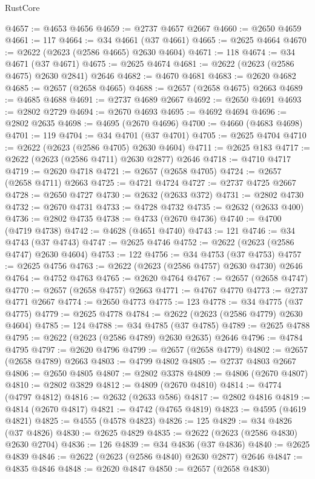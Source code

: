 \begin{lexlean}{RustCore}
\begin{coremodule}
@4657 := @4653 @4656
@4659 := @2737 @4657 @2667
@4660 := @2650 @4659
@4661 := 117
@4664 := @34 @4661 (@37 @4661)
@4665 := @2625 @4664
@4670 := @2622 (@2623 (@2586 @4665) @2630 @4604)
@4671 := 118
@4674 := @34 @4671 (@37 @4671)
@4675 := @2625 @4674
@4681 := @2622 (@2623 (@2586 @4675) @2630 @2841) @2646
@4682 := @4670 @4681
@4683 := @2620 @4682
@4685 := @2657 (@2658 @4665)
@4688 := @2657 (@2658 @4675) @2663
@4689 := @4685 @4688
@4691 := @2737 @4689 @2667
@4692 := @2650 @4691
@4693 := @2802 @2729
@4694 := @2670 @4693
@4695 := @4692 @4694
@4696 := @2802 @2635
@4698 := @4695 (@2670 @4696)
@4700 := @4660 (@4683 @4698)
@4701 := 119
@4704 := @34 @4701 (@37 @4701)
@4705 := @2625 @4704
@4710 := @2622 (@2623 (@2586 @4705) @2630 @4604)
@4711 := @2625 @183
@4717 := @2622 (@2623 (@2586 @4711) @2630 @2877) @2646
@4718 := @4710 @4717
@4719 := @2620 @4718
@4721 := @2657 (@2658 @4705)
@4724 := @2657 (@2658 @4711) @2663
@4725 := @4721 @4724
@4727 := @2737 @4725 @2667
@4728 := @2650 @4727
@4730 := @2632 (@2633 @372)
@4731 := @2802 @4730
@4732 := @2670 @4731
@4733 := @4728 @4732
@4735 := @2632 (@2633 @400)
@4736 := @2802 @4735
@4738 := @4733 (@2670 @4736)
@4740 := @4700 (@4719 @4738)
@4742 := @4628 (@4651 @4740)
@4743 := 121
@4746 := @34 @4743 (@37 @4743)
@4747 := @2625 @4746
@4752 := @2622 (@2623 (@2586 @4747) @2630 @4604)
@4753 := 122
@4756 := @34 @4753 (@37 @4753)
@4757 := @2625 @4756
@4763 := @2622 (@2623 (@2586 @4757) @2630 @4730) @2646
@4764 := @4752 @4763
@4765 := @2620 @4764
@4767 := @2657 (@2658 @4747)
@4770 := @2657 (@2658 @4757) @2663
@4771 := @4767 @4770
@4773 := @2737 @4771 @2667
@4774 := @2650 @4773
@4775 := 123
@4778 := @34 @4775 (@37 @4775)
@4779 := @2625 @4778
@4784 := @2622 (@2623 (@2586 @4779) @2630 @4604)
@4785 := 124
@4788 := @34 @4785 (@37 @4785)
@4789 := @2625 @4788
@4795 := @2622 (@2623 (@2586 @4789) @2630 @2635) @2646
@4796 := @4784 @4795
@4797 := @2620 @4796
@4799 := @2657 (@2658 @4779)
@4802 := @2657 (@2658 @4789) @2663
@4803 := @4799 @4802
@4805 := @2737 @4803 @2667
@4806 := @2650 @4805
@4807 := @2802 @3378
@4809 := @4806 (@2670 @4807)
@4810 := @2802 @3829
@4812 := @4809 (@2670 @4810)
@4814 := @4774 (@4797 @4812)
@4816 := @2632 (@2633 @586)
@4817 := @2802 @4816
@4819 := @4814 (@2670 @4817)
@4821 := @4742 (@4765 @4819)
@4823 := @4595 (@4619 @4821)
@4825 := @4555 (@4578 @4823)
@4826 := 125
@4829 := @34 @4826 (@37 @4826)
@4830 := @2625 @4829
@4835 := @2622 (@2623 (@2586 @4830) @2630 @2704)
@4836 := 126
@4839 := @34 @4836 (@37 @4836)
@4840 := @2625 @4839
@4846 := @2622 (@2623 (@2586 @4840) @2630 @2877) @2646
@4847 := @4835 @4846
@4848 := @2620 @4847
@4850 := @2657 (@2658 @4830)

\end{coremodule}
\end{lexlean}
